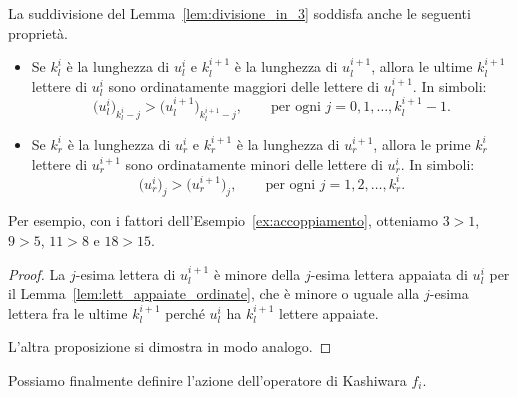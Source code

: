\begin{lemma}
    \label{lem:divisione_sgravo_comparativo}
    La suddivisione del Lemma~\ref{lem:divisione_in_3} soddisfa anche le seguenti 
    propriet\`a.
    \begin{itemize}
        \item Se $k^i_l$ \`e la lunghezza di $u^i_l$ e $k^{i+1}_l$ \`e la lunghezza
            di $u^{i+1}_l$, allora le ultime $k^{i+1}_l$ lettere di $u^i_l$ sono
            ordinatamente maggiori delle lettere di $u^{i+1}_l$.
            In simboli:
            \[
                \bigl(u^i_l\bigr)_{k^i_l - j} > \bigl(u^{i+1}_l\bigr)_{k^{i+1}_l -j}, \qquad 
                \text{per ogni $j=0, 1, \dots, k^{i+1}_l -1$.}
            \]
        \item Se $k^i_r$ \`e la lunghezza di $u^i_r$ e $k^{i+1}_r$ \`e la lunghezza
            di $u^{i+1}_r$, allora le prime $k^i_r$ lettere di $u^{i+1}_r$ sono
            ordinatamente minori delle lettere di $u^i_r$.
            In simboli:
            \[
                \bigl(u^i_r\bigr)_{j} > \bigl(u^{i+1}_r\bigr)_{j}, \qquad 
                \text{per ogni $j=1, 2, \dots, k^i_r$.}
            \]
    \end{itemize}
\end{lemma}

Per esempio, con i fattori dell'Esempio~\ref{ex:accoppiamento}, otteniamo
$3>1$, $9>5$, $11>8$ e $18>15$.

\begin{proof}
    La $j$-esima lettera di $u_l^{i+1}$ \`e minore della 
    $j$-esima lettera appaiata di $u_l^i$ per 
    il Lemma~\ref{lem:lett_appaiate_ordinate}, che \`e minore o uguale alla
    $j$-esima lettera fra le ultime $k_l^{i+1}$ perch\'e $u_l^i$ ha $k_l^{i+1}$
    lettere appaiate.

    L'altra proposizione si dimostra in modo analogo.
\end{proof}

Possiamo finalmente definire l'azione dell'operatore di Kashiwara $f_i$.

